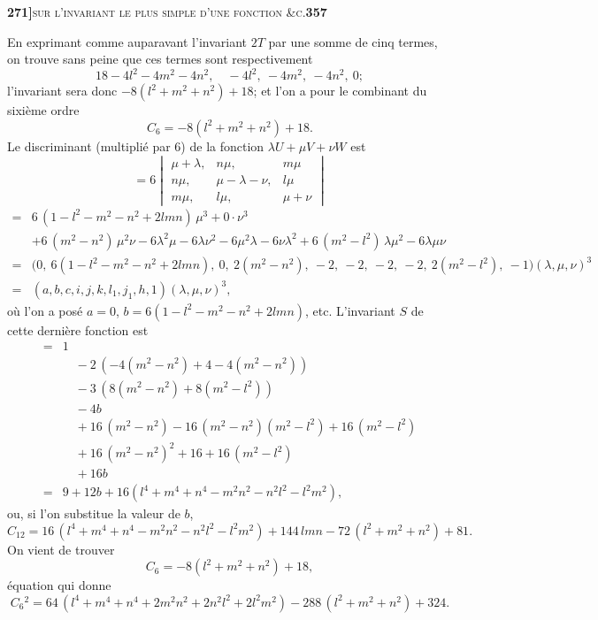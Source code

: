 \documentclass[11pt]{article}
\begin{document}
\newpage
\noindent\textbf{271]}\hfill\textsc{sur l'invariant le plus simple d'une fonction \&c.}\hfill\textbf{357}

\medskip

\noindent En exprimant comme auparavant l'invariant $2T$ par une somme de cinq termes, on trouve sans peine que ces termes sont respectivement
\[
18 - 4 l^2 - 4 m^2 - 4 n^2,\quad -4 l^2,\ -4 m^2,\ -4 n^2,\ 0;
\]
l'invariant sera donc $-8(l^2 + m^2 + n^2) + 18$; et l'on a pour le combinant du sixi\`eme ordre
\[
C_6 = -8(l^2 + m^2 + n^2) + 18.
\]
Le discriminant (multipli\'e par 6) de la fonction $\lambda U + \mu V + \nu W$ est
\[
= 6 \begin{vmatrix}
\mu+\lambda, & n\mu, & m\mu \\
n\mu, & \mu-\lambda-\nu, & l\mu \\
m\mu, & l\mu, & \mu+\nu
\end{vmatrix}
\]
\[
\begin{aligned}
={}& 6\,(1 - l^2 - m^2 - n^2 + 2 l m n)\, \mu^3 + 0 \cdot \nu^3 \\
&+ 6\,(m^2 - n^2)\, \mu^2 \nu - 6 \lambda^2 \mu - 6 \lambda \nu^2 - 6 \mu^2 \lambda - 6 \nu \lambda^2 + 6\,(m^2 - l^2)\, \lambda \mu^2 - 6 \lambda \mu \nu \\
={}& \big(0,\ 6(1 - l^2 - m^2 - n^2 + 2 l m n),\ 0,\ 2(m^2 - n^2),\ -2,\ -2,\ -2,\ -2,\ 2(m^2 - l^2),\ -1\big)(\lambda, \mu, \nu)^3 \\
={}& (a, b, c, i, j, k, l_1, j_1, h, 1)(\lambda, \mu, \nu)^3,
\end{aligned}
\]
o\`u l'on a pos\'e $a = 0$, $b = 6(1 - l^2 - m^2 - n^2 + 2 l m n)$, etc. L'invariant $S$ de cette derni\`ere fonction est
\[
\begin{aligned}
={}& 1 \\
&\quad - 2\,(-4(m^2 - n^2) + 4 - 4(m^2 - n^2)) \\
&\quad - 3\,(8(m^2 - n^2) + 8(m^2 - l^2)) \\
&\quad - 4 b \\
&\quad + 16\,(m^2 - n^2) - 16\,(m^2 - n^2)(m^2 - l^2) + 16\,(m^2 - l^2) \\
&\quad + 16\,(m^2 - n^2)^2 + 16 + 16\,(m^2 - l^2) \\
&\quad + 16 b \\
={}& 9 + 12 b + 16(l^4 + m^4 + n^4 - m^2 n^2 - n^2 l^2 - l^2 m^2),
\end{aligned}
\]
ou, si l'on substitue la valeur de $b$,
\[
C_{12} = 16\,(l^4 + m^4 + n^4 - m^2 n^2 - n^2 l^2 - l^2 m^2) + 144\, l m n - 72\,(l^2 + m^2 + n^2) + 81.
\]
On vient de trouver
\[
C_6 = -8(l^2 + m^2 + n^2) + 18,
\]
\'equation qui donne
\[
C_6{}^2 = 64\,(l^4 + m^4 + n^4 + 2 m^2 n^2 + 2 n^2 l^2 + 2 l^2 m^2) - 288\,(l^2 + m^2 + n^2) + 324.
\]
\end{document}
